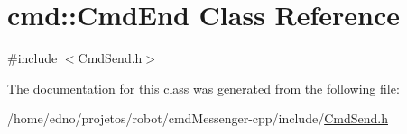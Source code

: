 \hypertarget{classcmd_1_1_cmd_end}{\section{cmd\+:\+:Cmd\+End Class Reference}
\label{classcmd_1_1_cmd_end}
}


{\ttfamily \#include $<$Cmd\+Send.\+h$>$}



The documentation for this class was generated from the following file\+:\begin{DoxyCompactItemize}
\item 
/home/edno/projetos/robot/cmd\+Messenger-\/cpp/include/\hyperlink{_cmd_send_8h}{Cmd\+Send.\+h}\end{DoxyCompactItemize}
